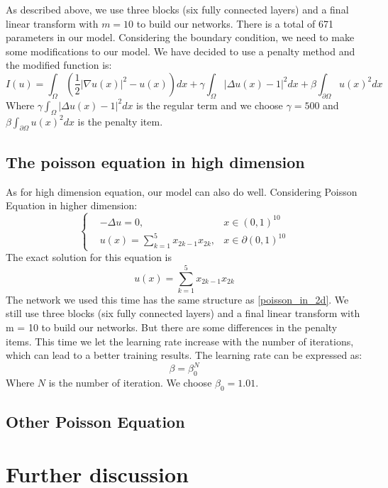 \documentclass{article}
\begin{document}
\par As described above, we use three blocks (six fully connected layers) and a final linear transform with $m=10$ to build our networks. There is a total of 671 parameters in our model. Considering the boundary condition, we need to make some modifications to our model. We have decided to use a penalty method and the modified function is:
\begin{equation}
I(u)=\int_{\Omega}\left(\frac{1}{2}|\nabla u(x)|^2-u(x)\right)dx+\gamma\int_{\Omega}|\Delta u(x) - 1|^2dx+\beta\int_{\partial \Omega}u(x)^2dx
\end{equation}
Where $\gamma\int_{\Omega}|\Delta u(x) - 1|^2dx$ is the regular term and we choose $\gamma=500$ and $\beta\int_{\partial \Omega}u(x)^2dx$ is the penalty item.

\subsection{The poisson equation in high dimension}
As for high dimension equation, our model can also do well. Considering Poisson Equation in higher dimension:
\begin{equation}
\left \{
\begin{aligned}
&-\Delta u =0, &x\in (0,1)^{10} \\
&u(x)=\sum\limits_{k=1}^5x_{2k-1}x_{2k}, &x\in \partial (0,1)^{10}
\end{aligned}
\right.
\end{equation}
The exact solution for this equation is 
\begin{equation}
u(x)=\sum\limits_{k=1}^5x_{2k-1}x_{2k}
\end{equation}
The network we used this time has the same structure as \ref{poisson_in_2d}. We still use three blocks (six fully connected layers) and a final linear transform with m = 10 to build our networks. But there are some differences in the penalty items. This time we let the learning rate increase with the number of iterations, which can lead to a better training results. The learning rate can be expressed as:
\begin{equation}
\beta=\beta_{0}^N
\end{equation}
Where $N$ is the number of iteration. We choose $\beta_0=1.01$.

\subsection{Other Poisson Equation}


\section{Further discussion}




\medskip

\small
\end{document}
